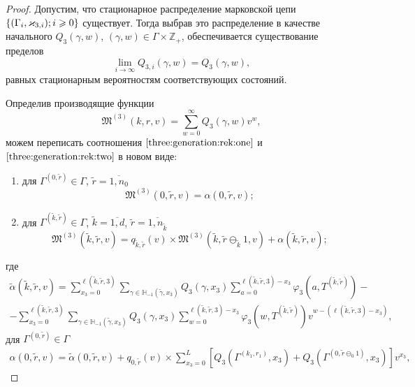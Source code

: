 \begin{proof}

Допустим,  что стационарное распределение марковской цепи $\MarkThree$ существует. Тогда выбрав это распределение в качестве начального $Q_3(\gamma, w)$,  $(\gamma, w)\in \Gamma\times {\mathbb Z}_+$,  обеспечивается существование пределов 
$$
\lim_{i\to \infty} Q_{3, i}(\gamma, w) = Q_3(\gamma, w), 
$$
равных стационарным вероятностям соответствующих состояний. 

Определив производящие функции
$$
\mathfrak{M}^{(3)}(k, r, v) = \sum_{w=0}^{\infty} Q_3(\gamma, w) v^w, 
$$
можем переписать соотношения $\eqref{three:generation:rek:one}$ и $\eqref{three:generation:rek:two}$ в новом виде:
\begin{enumerate}
\item для $ \Gamma^{(0, \tilde{r})} \in \Gamma$,  $\tilde{r} = \overline{1, n_0}$ 
\begin{equation}
\mathfrak{M}^{(3)}(0, \tilde{r}, v) = \alpha(0, \tilde{r}, v);
\label{three:generation:one}
\end{equation}
\item для $\Gamma^{(\tilde{k}, \tilde{r})} \in \Gamma $,  $\tilde{k} =\overline{1, d}$,  $\tilde{r}=\overline{1, n_{\tilde{k}}}$
\begin{equation}
\mathfrak{M}^{(3)}(\tilde{k}, \tilde{r}, v) = q_{\tilde{k}, \tilde{r}} (v)\times  \mathfrak{M}^{(3)}(\tilde{k}, \tilde{r} \ominus_{\tilde{k}} 1, v) + \alpha(\tilde{k}, \tilde{r}, v);
\label{three:generation:two}
\end{equation}
\end{enumerate}
где 
\begin{multline}
\tilde{\alpha}(\tilde{k}, \tilde{r}, v) = \sum_{x_3=0}^{\ell(\tilde{k}, \tilde{r}, 3)}\sum_{\gamma \in {\mathbb H}_{-1}(\tilde{\gamma}, x_3)} Q_3(\gamma, x_3) \sum_{a=0}^{\ell(\tilde{k}, \tilde{r}, 3) - x_3} \varphi_3(a, T^{(\tilde{k}, \tilde{r})}) - \\
- \sum_{x_3=0}^{\ell(\tilde{k}, \tilde{r}, 3)}  \sum_{\gamma \in {\mathbb H}_{-1}(\tilde{\gamma}, x_3)} Q_3(\gamma, x_3) \sum_{w=0}^{\ell(\tilde{k}, \tilde{r}, 3) -x_3}
\varphi_3(w, T^{(\tilde{k}, \tilde{r})}) v^{w-(\ell(\tilde{k}, \tilde{r}, 3)-x_3)},
\end{multline}
для $ \Gamma^{(0, \tilde{r})} \in \Gamma$
\begin{multline}
\alpha(0, \tilde{r}, v) =\tilde{\alpha}(0, \tilde{r}, v) + q_{0, \tilde{r}}(v) \times \sum_{x_3=0}^{L} \left[ Q_3(\Gamma^{(k_1, r_1)}, x_3) + Q_3(\Gamma^{(0, \tilde{r}\ominus_0 1)}, x_3) \right] v^{x_3},

\end{multline}
\end{proof}
